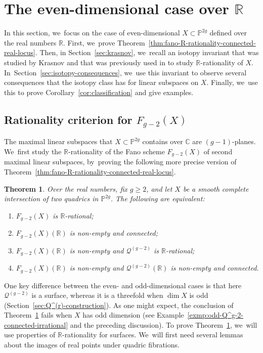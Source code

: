 \documentclass[JEP,XML,SOM,Unicode,NoEqCountersInSection,published]{cedram}
\let\cal\mathcal
\let\bb\mathbb\let\Bbb\mathbb
\theoremstyle{plain}
\newtheorem{thm}{Theorem}[section]
\theoremstyle{definition}
\renewcommand\P{\mathbb{P}}
\newcommand\R{\mathbb{R}}
\begin{document}
\section{The even-dimensional case over \texorpdfstring{\(\bb R\)}{R}}\label{sec:real-even}

In this section, we~focus on the case of even-dimensional \(X \subset \bb P^{2g}\) defined over the real numbers \(\bb R\). First, we~prove Theorem~\ref{thm:fano-R-rationality-connected-real-locus}. Then, in Section~\ref{sec:krasnov}, we~recall an isotopy invariant that was studied by Krasnov \cite{krasnov-biquadrics} and that was previously used in \cite{HT-intersection-quadrics,HassettKoll'arTschinkel} to study \(\bb R\)-rationality of \(X\). In~Section~\ref{sec:isotopy-consequences}, we~use this invariant to observe several consequences that the isotopy class has for linear subspaces on \(X\). Finally, we~use this to prove Corollary~\ref{cor:classification} and give examples.

\subsection{Rationality criterion for \(F_{g-2}(X)\)}
The maximal linear subspaces that \(X \subset \bb P^{2g}\) contains over \(\bb C\) are \((g-1)\)-planes. We~first study the \(\bb R\)-rationality of the Fano scheme \(F_{g-2}(X)\) of second maximal linear subspaces, by~proving the following more precise version of Theorem~\ref{thm:fano-R-rationality-connected-real-locus}.

\begin{thm}\label{thm:fano-R-rationality-connected-real-locus-precise}
Over the real numbers, fix $g\geq 2$, and let $X$ be a smooth complete intersection of two quadrics in $\P^{2g}$.
The following are equivalent:
\begin{enumerate}
\item\label{item:real-2nd-maximal-rationality} $F_{g-2}(X)$ is $\R$-rational;
\item\label{item:real-2nd-maximal-connected} $F_{g-2}(X)(\R)$ is non-empty and connected;
\item\label{item:real-2nd-maximal-Q-rationality} $F_{g-2}(X)(\R)$ is non-empty and $\mathcal{Q}^{(g-2)}$ is $\R$-rational;
\item\label{item:real-2nd-maximal-Q-connected} $F_{g-2}(X)(\R)$ is non-empty and $\mathcal{Q}^{(g-2)}(\R)$ is non-empty and connected.
\end{enumerate}
\end{thm}
One key difference between the even- and odd-dimensional cases is that here \(\cal Q^{(g-2)}\) is a surface, whereas it is a threefold when \(\dim X\) is odd (Section~\ref{sec:Q^(r)-construction}). As one might expect, the conclusion of Theorem~\ref{thm:fano-R-rationality-connected-real-locus-precise} fails when \(X\) has odd dimension (see Example~\ref{exmp:odd-Q^g-2-connected-irrational} and the preceding discussion). To prove Theorem~\ref{thm:fano-R-rationality-connected-real-locus-precise}, we~will use properties of \(\bb R\)-rationality for surfaces. We~will first need several lemmas about the images of real points under quadric fibrations.
\end{document}

